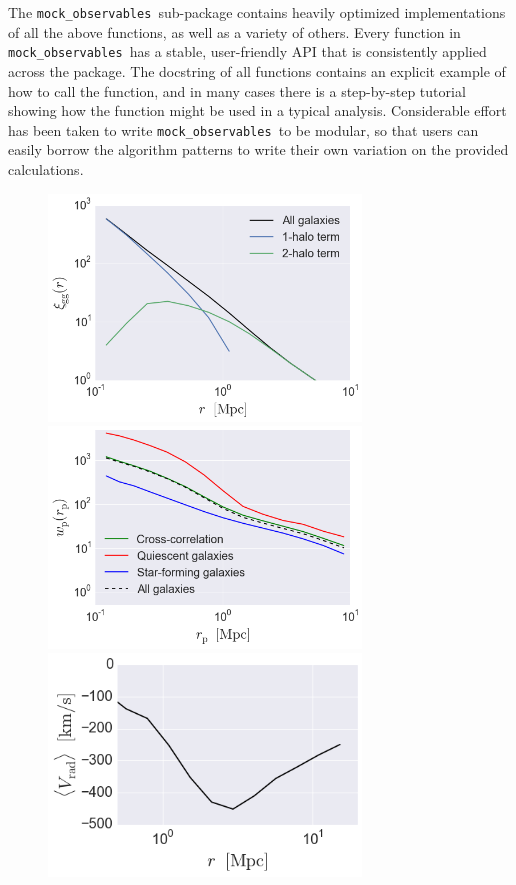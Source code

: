 \documentclass[twocolumn, tighten]{aastex6}
\newcommand{\mockobs}{{\tt mock\_observables }}
\begin{document}
The \mockobs sub-package contains heavily optimized implementations of all the above functions, as well as a variety of others. Every function in \mockobs has a stable, user-friendly API that is consistently applied across the package. The docstring of all functions contains an explicit example of how to call the function, and in many cases there is a step-by-step tutorial showing how the function might be used in a typical analysis. Considerable effort has been taken to write \mockobs to be modular, so that users can easily borrow the algorithm patterns to write their own variation on the provided calculations. 

\begin{figure}
\begin{center}
\includegraphics[width=8.3cm]{./FIGS/one_two_halo_clustering.png}
\includegraphics[width=8.3cm]{./FIGS/wp_red_blue_cross.png}
\includegraphics[width=8.3cm]{./FIGS/cluster_bcg_infall_velocity.png}

\end{center}
\end{figure}
\end{document}

